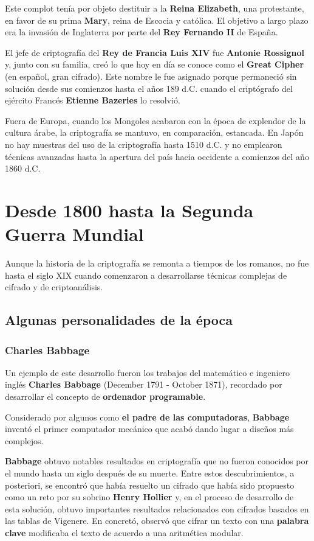 \documentclass[nochap]{apuntesURJC}
\begin{document}
Este complot tenía por objeto destituir a la \textbf{Reina Elizabeth}, una protestante, en favor de su prima \textbf{Mary}, reina de Escocia y católica. El objetivo a largo plazo era la invasión de Inglaterra por parte del \textbf{Rey Fernando II} de España.

El jefe de criptografía del \textbf{Rey de Francia Luis XIV} fue \textbf{Antonie Rossignol} y, junto con su familia, creó lo que hoy en día se conoce como el \textbf{Great Cipher} (en español, gran cifrado). Este nombre le fue asignado porque permaneció sin solución desde sus comienzos hasta el años 189 d.C. cuando el criptógrafo del ejército Francés \textbf{Etienne Bazeries} lo resolvió.

Fuera de Europa, cuando los Mongoles acabaron con la época de explendor de la cultura árabe, la criptografía se mantuvo, en comparación, estancada. En Japón no hay muestras del uso de la criptografía hasta 1510 d.C. y no emplearon técnicas avanzadas hasta la apertura del país hacia occidente a comienzos del año 1860 d.C.

\section{Desde 1800 hasta la Segunda Guerra Mundial}
Aunque la historia de la criptografía se remonta a tiempos de los romanos, no fue hasta el siglo XIX cuando comenzaron a desarrollarse técnicas complejas de cifrado y de criptoanálisis.

\subsection{Algunas personalidades de la época}
\subsubsection{Charles Babbage}
Un ejemplo de este desarrollo fueron los trabajos del matemático e ingeniero inglés \textbf{Charles Babbage} (December 1791 - October 1871), recordado por desarrollar el concepto de \textbf{ordenador programable}.

Considerado por algunos como \textbf{el padre de las computadoras}, \textbf{Babbage} inventó el primer computador mecánico que acabó dando lugar a diseños más complejos.

\textbf{Babbage} obtuvo notables resultados en criptografía que no fueron conocidos por el mundo hasta un siglo después de su muerte. Entre estos descubrimientos, a posteriori, se encontró que había resuelto un cifrado que había sido propuesto como un reto por su sobrino \textbf{Henry Hollier} y, en el proceso de desarrollo de esta solución, obtuvo importantes resultados relacionados con cifrados basados en las tablas de Vigenere. En concretó, observó que cifrar un texto con una \textbf{palabra clave} modificaba el texto de acuerdo a una aritmética modular.
\end{document}
